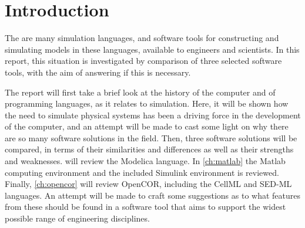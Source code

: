 \documentclass[\rootfolder/main.tex]{subfiles}
\begin{document}
\chapter{Introduction} %

\label{ch:introduction} %

The are many simulation languages, and software tools for constructing and simulating models in these languages, available to engineers and scientists.
In this report, this situation is investigated by comparison of three selected software tools, with the aim of answering if this is necessary.

The report will first take a brief look at the history of the computer and of programming languages, as it relates to simulation.
Here, it will be shown how the need to simulate physical systems has been a driving force in the development of the computer, and an attempt will be made to cast some light on why there are so many software solutions in the field.
Then, three software solutions will be compared, in terms of their similarities and differences as well as their strengths and weaknesses.
 will review the Modelica language.
In \cref{ch:matlab} the Matlab computing environment and the included Simulink environment is reviewed.
Finally, \cref{ch:opencor} will review OpenCOR, including the CellML and SED-ML languages.
An attempt will be made to craft some suggestions as to what features from these should be found in a software tool that aims to support the widest possible range of engineering disciplines.
\end{document}
